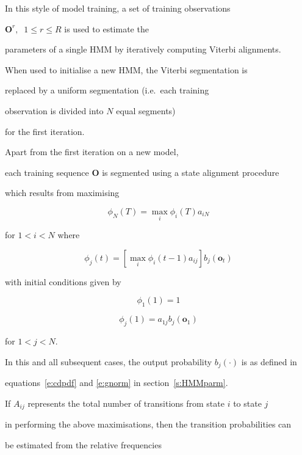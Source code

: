 

In this style of model training, a set of training observations


$\bm{O}^r, \;\; 1 \leq r \leq R$ is used to estimate the 


parameters of a single HMM by iteratively computing Viterbi alignments.


When used to initialise a new HMM, the Viterbi segmentation is


replaced by a uniform segmentation (i.e.\ each training


observation is divided into $N$ equal segments) 


for the first iteration.





Apart from the first iteration on a new model, 


each training sequence $\bm{O}$ is segmented using a state alignment procedure


which results from maximising


\[


    \phi_N(T) = \max_i \phi_i(T) a_{iN}


\]


for $1<i<N$ where


\[


  \phi_j(t) = \left[ \max_i \phi_i(t-1) a_{ij} \right] b_j(\bm{o}_t)


\]


with initial conditions given by 


\[


    \phi_1(1) = 1


\]


\[


    \phi_j(1) = a_{1j} b_j(\bm{o}_1)


\]


for $1<j<N$. 


In this and all subsequent cases, the output  probability $b_j(\cdot)$ is as defined in


equations~\ref{e:cdpdf} and \ref{e:gnorm} in section~\ref{s:HMMparm}.





If $A_{ij}$ represents the total number of transitions from state $i$ to state $j$


in performing the above maximisations, then the transition probabilities can


be estimated from the relative frequencies



